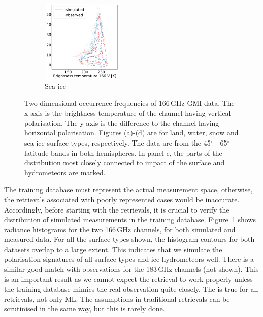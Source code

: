 \documentclass[12pt,oneside,a4paper]{article}
\begin{document}
\begin{figure}[t]
\begin{subfigure}{.24\textwidth}
	\caption{ Sea-ice}
	\includegraphics[height = 39mm, width = 39mm]{Figures/hist2d_gmi_highlat_sea-ice.pdf}
\end{subfigure}
\caption{Two-dimensional occurrence frequencies of 166\,GHz GMI data. The x-axis
  is the brightness temperature of the channel having vertical polarisation.
  The y-axis is the difference to the channel having horizontal polarisation.
  Figures (a)-(d) are for land, water, snow and sea-ice surface types,
  respectively. The data are from the 45$^\circ$ - 65$^\circ$ latitude bands in
  both hemispheres. In panel c, the parts of the distribution most closely
  connected to impact of the surface and hydrometeors are marked.}
  \label{fig:histogram_2d}
\end{figure}

The training database must represent the actual measurement space, otherwise,
the retrievals associated with poorly represented cases would be inaccurate.
Accordingly, before starting with the retrievals, it is crucial to verify the
distribution of simulated measurements in the training database.
Figure~\ref{fig:histogram_2d} shows radiance histograms for the two 166\,GHz
channels, for both simulated and measured data. For all the surface types
shown, the histogram contours for both datasets overlap to a large extent. This
indicates that we simulate the polarisation signatures of all surface types and
ice hydrometeors well. There is a similar good match with observations for the
183\,GHz channels (not shown). This is an important result as we cannot expect
the retrieval to work properly unless the training database mimics the real
observation quite closely. The is true for all retrievals, not only ML. The
assumptions in traditional retrievals can be scrutinised in the same way, but
this is rarely done.
\end{document}

